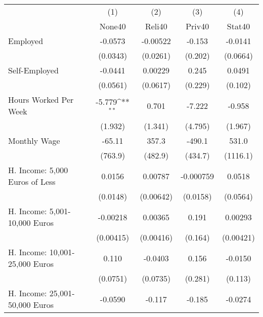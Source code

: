 {
\def\sym#1{\ifmmode^{#1}\else\(^{#1}\)\fi}
\begin{tabular}{l*{4}{c}}
\hline\hline
            &\multicolumn{1}{c}{(1)}&\multicolumn{1}{c}{(2)}&\multicolumn{1}{c}{(3)}&\multicolumn{1}{c}{(4)}\\
            &\multicolumn{1}{c}{None40}&\multicolumn{1}{c}{Reli40}&\multicolumn{1}{c}{Priv40}&\multicolumn{1}{c}{Stat40}\\
\hline
Employed    &     -0.0573         &    -0.00522         &      -0.153         &     -0.0141         \\
            &    (0.0343)         &    (0.0261)         &     (0.202)         &    (0.0664)         \\
[1em]
Self-Employed&     -0.0441         &     0.00229         &       0.245         &      0.0491         \\
            &    (0.0561)         &    (0.0617)         &     (0.229)         &     (0.102)         \\
[1em]
Hours Worked Per Week&      -5.779\sym{**} &       0.701         &      -7.222         &      -0.958         \\
            &     (1.932)         &     (1.341)         &     (4.795)         &     (1.967)         \\
[1em]
Monthly Wage&      -65.11         &       357.3         &      -490.1         &       531.0         \\
            &     (763.9)         &     (482.9)         &     (434.7)         &    (1116.1)         \\
[1em]
H. Income: 5,000 Euros of Less&      0.0156         &     0.00787         &   -0.000759         &      0.0518         \\
            &    (0.0148)         &   (0.00642)         &    (0.0158)         &    (0.0564)         \\
[1em]
H. Income: 5,001-10,000 Euros&    -0.00218         &     0.00365         &       0.191         &     0.00293         \\
            &   (0.00415)         &   (0.00416)         &     (0.164)         &   (0.00421)         \\
[1em]
H. Income: 10,001-25,000 Euros&       0.110         &     -0.0403         &       0.156         &     -0.0150         \\
            &    (0.0751)         &    (0.0735)         &     (0.281)         &     (0.113)         \\
[1em]
H. Income: 25,001-50,000 Euros&     -0.0590         &      -0.117         &      -0.185         &     -0.0274         \\

\end{tabular}}
